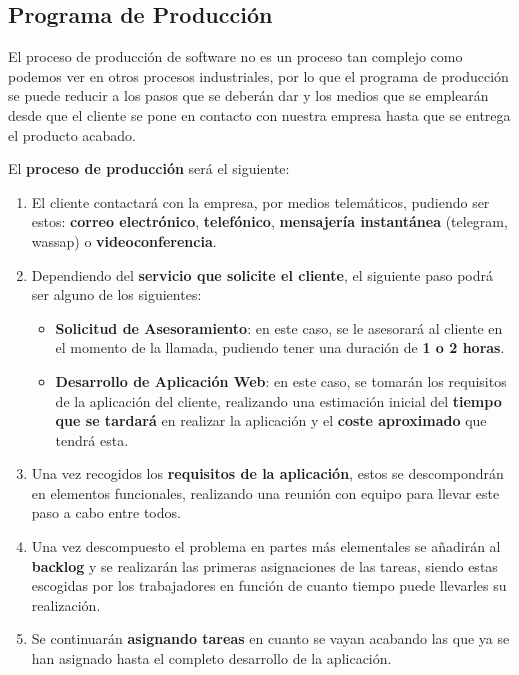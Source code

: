\subsection{Programa de Producción}
El proceso de producción de software no es un proceso tan complejo como podemos ver en otros procesos industriales, por lo que el programa de producción se puede reducir a los pasos que se deberán dar y los medios que se emplearán desde que el cliente se pone en contacto con nuestra empresa hasta que se entrega el producto acabado.

El \textbf{proceso de producción} será el siguiente:

\begin{enumerate}
    \item El cliente contactará con la empresa, por medios telemáticos, pudiendo ser estos: \textbf{correo electrónico}, \textbf{telefónico}, \textbf{mensajería instantánea} (telegram, wassap) o \textbf{videoconferencia}.

    \item Dependiendo del \textbf{servicio que solicite el cliente}, el siguiente paso podrá ser alguno de los siguientes:
    \begin{itemize}
        \item \textbf{Solicitud de Asesoramiento}: en este caso, se le asesorará al cliente en el momento de la llamada, pudiendo tener una duración de \textbf{1 o 2 horas}.

        \item \textbf{Desarrollo de Aplicación Web}: en este caso, se tomarán los requisitos de la aplicación del cliente, realizando una estimación inicial del \textbf{tiempo que se tardará} en realizar la aplicación y el \textbf{coste aproximado} que tendrá esta.
    \end{itemize}

    \item Una vez recogidos los \textbf{requisitos de la aplicación}, estos se descompondrán en elementos funcionales, realizando una reunión con equipo para llevar este paso a cabo entre todos.

    \item Una vez descompuesto el problema en partes más elementales se añadirán al \textbf{backlog} y se realizarán las primeras asignaciones de las tareas, siendo estas escogidas por los trabajadores en función de cuanto tiempo puede llevarles su realización.

    \item Se continuarán \textbf{asignando tareas} en cuanto se vayan acabando las que ya se han asignado hasta el completo desarrollo de la aplicación.
\end{enumerate}


